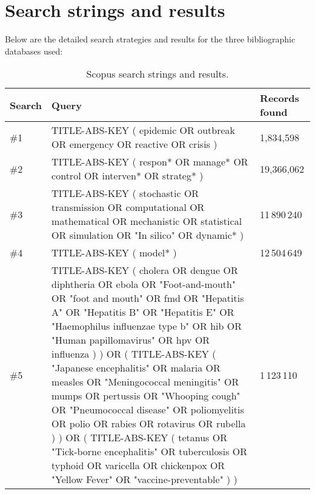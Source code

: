 \documentclass[10pt,a4paper]{article}
\begin{document}
\newpage	
\section{Search strings and results}
Below are the detailed search strategies and results for the three bibliographic databases used:

\begin{sidewaysfigure}
	\begin{table}[H]
		\centering
		\caption{Scopus search strings and results.}
		\begin{tabular}{lp{}l}
			\toprule
			\textbf{Search} & \textbf{Query} & \textbf{Records found} \\
			\midrule
			\#1 & TITLE-ABS-KEY ( epidemic  OR    outbreak  OR  emergency    OR  reactive  OR    crisis ) & 1,834,598 \\
			\#2 & TITLE-ABS-KEY ( respon*  OR    manage*  OR  control    OR  interven*  OR    strateg* ) & 19,366,062 \\
			\#3 & TITLE-ABS-KEY ( stochastic  OR    transmission  OR  computational  OR    mathematical  OR  mechanistic    OR  statistical  OR    simulation  OR  "In silico"  OR    dynamic* ) & 11\,890\,240 \\
			\#4 & TITLE-ABS-KEY ( model* ) & 12\,504\,649 \\
			\#5 & TITLE-ABS-KEY ( cholera  OR    dengue  OR  diphtheria    OR  ebola  OR    "Foot-and-mouth"    OR  "foot and mouth"  OR    fmd  OR  "Hepatitis A"  OR    "Hepatitis B"  OR  "Hepatitis E"  OR  "Haemophilus   influenzae type b"  OR  hib    OR  "Human   papillomavirus"  OR  hpv    OR  influenza ) )  OR   (   TITLE-ABS-KEY ( "Japanese encephalitis"  OR    malaria  OR  measles    OR  "Meningococcal   meningitis"   OR  mumps    OR  pertussis  OR    "Whooping cough"    OR  "Pneumococcal   disease"  OR  poliomyelitis  OR    polio  OR  rabies    OR  rotavirus  OR    rubella ) )  OR  ( TITLE-ABS-KEY ( tetanus  OR    "Tick-borne encephalitis"    OR  tuberculosis  OR    typhoid  OR  varicella    OR  chickenpox  OR    "Yellow Fever"    OR    "vaccine-preventable" ) )& 1\,123\,110 \\

\end{tabular}
\end{table}
\end{sidewaysfigure}
\end{document}
